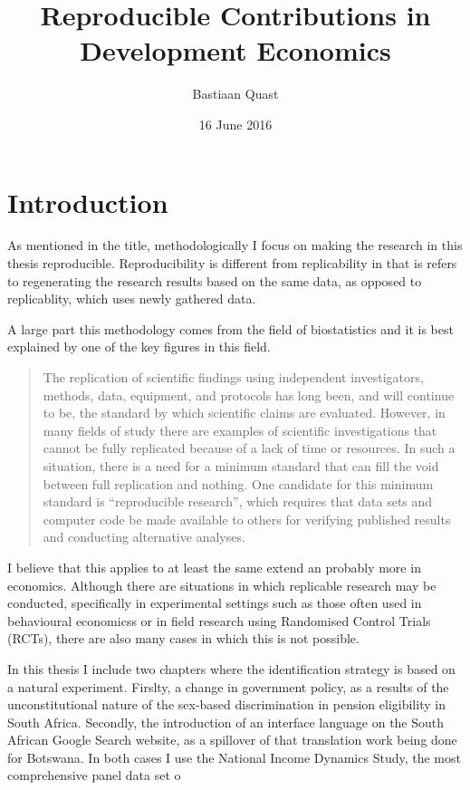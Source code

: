 \documentclass[a4paper,oneside,british]{book}\usepackage[]{graphicx}\usepackage[]{color}
\begin{document}
\title{Reproducible Contributions in Development Economics}

\author{Bastiaan Quast}

\date{16 June 2016}

\maketitle
\tableofcontents{}


\chapter*{Introduction}




As mentioned in the title, methodologically I focus on making the
research in this thesis reproducible. Reproducibility is different
from replicability in that is refers to regenerating the research
results based on the same data, as opposed to replicablity, which
uses newly gathered data. 

A large part this methodology comes from the field of biostatistics
and it is best explained by one of the key figures in this field.
\begin{quotation}
The replication of scientific findings using independent investigators,
methods, data, equipment, and protocols has long been, and will continue
to be, the standard by which scientific claims are evaluated. However,
in many fields of study there are examples of scientific investigations
that cannot be fully replicated because of a lack of time or resources.
In such a situation, there is a need for a minimum standard that can
fill the void between full replication and nothing. One candidate
for this minimum standard is \textquotedblleft reproducible research\textquotedblright ,
which requires that data sets and computer code be made available
to others for verifying published results and conducting alternative
analyses.
\end{quotation}
I believe that this applies to at least the same extend an probably
more in economics. Although there are situations in which replicable
research may be conducted, specifically in experimental settings such
as those often used in behavioural economicss or in field research
using Randomised Control Trials (RCTs), there are also many cases
in which this is not possible.

In this thesis I include two chapters where the identification strategy
is based on a natural experiment. Firslty, a change in government
policy, as a results of the unconstitutional nature of the sex-based
discrimination in pension eligibility in South Africa. Secondly, the
introduction of an interface language on the South African Google
Search website, as a spillover of that translation work being done
for Botswana. In both cases I use the National Income Dynamics Study,
the most comprehensive panel data set o
\end{document}
